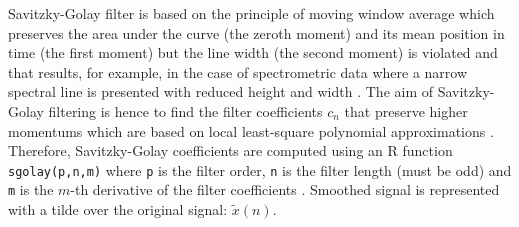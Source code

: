Savitzky-Golay filter is based on the principle of moving 
window average which preserves the area under the curve (the zeroth moment)
and its mean position in time (the first moment) but the line width 
(the second moment) is violated and that results, for example, in the case 
of spectrometric data where a narrow spectral line is presented with 
reduced height and width \citep{press1992}.
The aim of Savitzky-Golay filtering is hence to find the filter coefficients 
$c_n$ that preserve higher momentums which are based on local least-square 
polynomial approximations 
\citep{savitzkygolay1964, press1992, schafer2011}.
Therefore, Savitzky-Golay coefficients are computed using an R function 
\texttt{sgolay(p,n,m)} where \texttt{p} is the filter order, 
\texttt{n} is the filter length (must be odd) 
and \texttt{m} is the $m$-th derivative of the filter coefficients 
\citep{Rsignal}. Smoothed signal is represented with a tilde over the 
original signal: $\tilde{x}(n)$.

